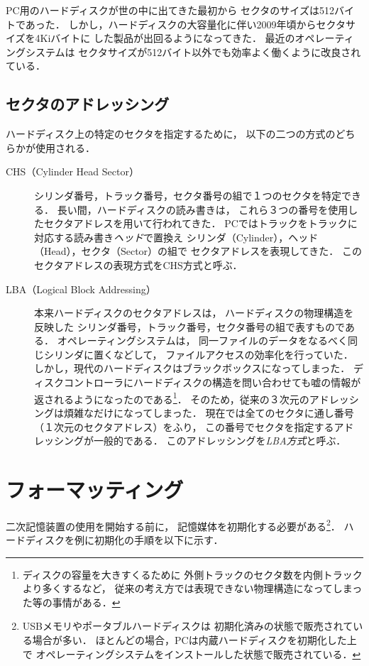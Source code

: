 PC用のハードディスクが世の中に出てきた最初から
セクタのサイズは512バイトであった．
しかし，ハードディスクの大容量化に伴い2009年頃からセクタサイズを4Kiバイトに
した製品が出回るようになってきた．
最近のオペレーティングシステムは
セクタサイズが512バイト以外でも効率よく働くように改良されている．

\subsection{セクタのアドレッシング}
ハードディスク上の特定のセクタを指定するために，
以下の二つの方式のどちらかが使用される．

\begin{description}
\item[CHS（Cylinder Head Sector）]
  シリンダ番号，トラック番号，セクタ番号の組で１つのセクタを特定できる．
  長い間，ハードディスクの読み書きは，
  これら３つの番号を使用したセクタアドレスを用いて行われてきた．
  PCではトラックをトラックに対応する読み書き\emph{ヘッド}で置換え
  シリンダ（Cylinder），ヘッド（Head），セクタ（Sector）の組で
  セクタアドレスを表現してきた．
  このセクタアドレスの表現方式をCHS方式と呼ぶ．
\item[LBA（Logical Block Addressing）]
  本来ハードディスクのセクタアドレスは，
  ハードディスクの物理構造を反映した
  シリンダ番号，トラック番号，セクタ番号の組で表すものである．
  オペレーティングシステムは，
  同一ファイルのデータをなるべく同じシリンダに置くなどして，
  ファイルアクセスの効率化を行っていた．
  しかし，現代のハードディスクはブラックボックスになってしまった．
  ディスクコントローラにハードディスクの構造を問い合わせても嘘の情報が
  返されるようになったのである\footnote{
    ディスクの容量を大きすくるために
    外側トラックのセクタ数を内側トラックより多くするなど，
    従来の考え方では表現できない物理構造になってしまった等の事情がある．}．
  そのため，従来の３次元のアドレッシングは煩雑なだけになってしまった．
  現在では全てのセクタに通し番号（１次元のセクタアドレス）をふり，
  この番号でセクタを指定するアドレッシングが一般的である．
  このアドレッシングを\emph{LBA方式}と呼ぶ．
\end{description}

\section{フォーマッティング}
二次記憶装置の使用を開始する前に，
記憶媒体を初期化する必要がある\footnote{
  USBメモリやポータブルハードディスクは
  初期化済みの状態で販売されている場合が多い．
  ほとんどの場合，PCは内蔵ハードディスクを初期化した上で
  オペレーティングシステムをインストールした状態で販売されている．
}．
ハードディスクを例に初期化の手順を以下に示す．


